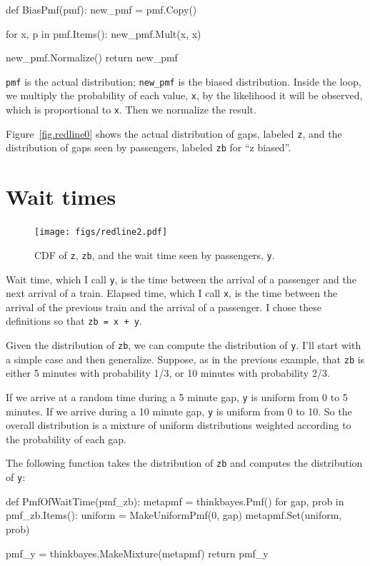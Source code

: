 \documentclass[12pt]{book}
\theoremstyle{exercise}
\begin{document}
\begin{code}
def BiasPmf(pmf):
    new_pmf = pmf.Copy()

    for x, p in pmf.Items():
        new_pmf.Mult(x, x)
        
    new_pmf.Normalize()
    return new_pmf
\end{code}

{\tt pmf} is the actual distribution; \verb"new_pmf" is the
biased distribution.  Inside the loop, we multiply the
probability of each value, {\tt x}, by the likelihood it will
be observed, which is proportional to {\tt x}.  Then we
normalize the result.

Figure~\ref{fig.redline0} shows the actual distribution of gaps,
labeled {\tt z}, and the distribution of gaps seen by passengers,
labeled {\tt zb} for ``z biased''.


\section{Wait times}

\begin{figure}
\centerline{\texttt{[image: figs/redline2.pdf]}}
\caption{CDF of {\tt z}, {\tt zb}, and the wait time seen
by passengers, {\tt y}. }
\label{fig.redline2}
\end{figure}

Wait time, which I call {\tt y}, is the time between the arrival
of a passenger and the next arrival of a train.  Elapsed time, which I
call {\tt x}, is the time between the arrival of the previous
train and the arrival of a passenger.  I chose these definitions
so that {\tt zb = x + y}.

Given the distribution of {\tt zb}, we can compute the distribution of
{\tt y}.  I'll start with a simple case and then generalize.
Suppose, as in the previous example, that {\tt zb} is either 5 minutes
with probability 1/3, or 10 minutes with probability 2/3.

If we arrive at a random time during a 5 minute gap, 
{\tt y} is uniform from 0 to 5 minutes.  If we arrive during a 10
minute gap, {\tt y} is uniform from 0 to 10.  So the overall
distribution is a mixture of uniform distributions weighted
according to the probability of each gap.

The following function takes the distribution of {\tt zb} and
computes the distribution of {\tt y}:

\begin{code}
def PmfOfWaitTime(pmf_zb):
    metapmf = thinkbayes.Pmf()
    for gap, prob in pmf_zb.Items():
        uniform = MakeUniformPmf(0, gap)
        metapmf.Set(uniform, prob)

    pmf_y = thinkbayes.MakeMixture(metapmf)
    return pmf_y
\end{code}
\end{document}
